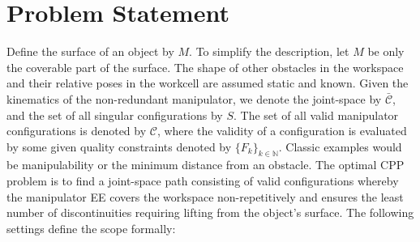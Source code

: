 \documentclass[conference]{IEEEtran}
\begin{document}
\section{Problem Statement}
Define the surface of an object by $M$. To simplify the description, let $M$ be only the coverable part of the surface. 
The shape of other obstacles in the workspace and their relative poses in the workcell are assumed static and known.
Given the kinematics of the non-redundant manipulator, we denote the joint-space by $\bar{\mathscr{C}}$, and the set of all singular configurations by $S$. 
The set of all valid manipulator configurations is denoted by $\mathscr{C}$, where the validity of a configuration is evaluated by some given quality constraints denoted by $\{F_k\}_{k\in \mathbb{N}}$. Classic examples would be manipulability or the minimum distance from an obstacle. 
The optimal CPP problem is to find a joint-space path consisting of valid configurations whereby the manipulator EE covers the workspace non-repetitively 
and ensures the least number of discontinuities requiring lifting from the object's surface. The following settings define the scope formally: 
\end{document}

